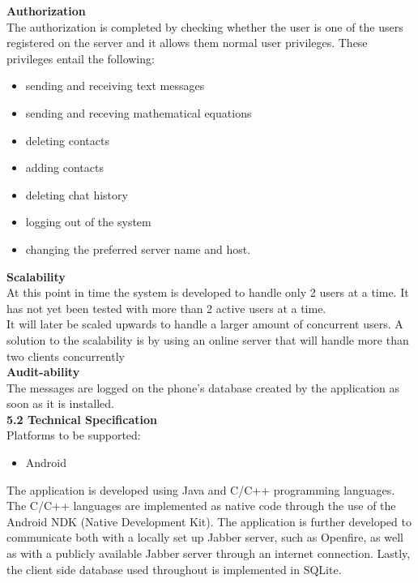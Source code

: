 \documentclass[29pt,a4paper]{moderncv}
\begin{document}
		\noindent \textbf{Authorization}\\
		The authorization is completed by checking whether the user is one of the users registered on the server and it allows them normal user privileges.
		These privileges entail the following: \\
		\begin{itemize}
		\item sending and receiving text messages
		\item sending and receving mathematical equations 
		\item deleting contacts
		\item adding contacts 
		\item deleting chat history
		\item logging out of the system
		\item changing the preferred server name and host.
		\\
		\end{itemize}
		
		\noindent \textbf{Scalability}\\
		At this point in time the system is developed to handle only 2 users at a time. It has not yet been tested with more than 2 active users at a time.
		\\It will later be scaled upwards to handle a larger amount of concurrent users. A solution to the scalability is by using an online server that will handle more than two clients concurrently\\
		
		
		\noindent \textbf{Audit-ability}\\
		The messages are logged on the phone’s database created by the application as soon as it is installed.\\
		
		\noindent \textbf{5.2 Technical Specification}\\
		Platforms to be supported:
		\begin{itemize}
			\item Android
			\\
		\end{itemize}
		The application is developed using Java and C/C++ programming languages.  The C/C++ languages are implemented as native code through the use of the Android NDK (Native Development Kit).
		The application is further developed to communicate both with a locally set up Jabber server, such as Openfire, as well as with a publicly available Jabber server through an internet connection.
		Lastly, the client side database used throughout is implemented in SQLite.
		\\
		
\end{document}
